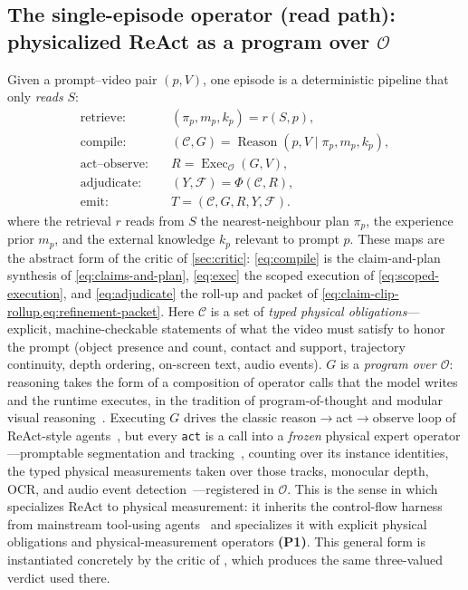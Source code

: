 \subsection{The single-episode operator (read path): physicalized ReAct as a program over \texorpdfstring{$\mathcal{O}$}{O}}
\label{sec:framework:episode}

Given a prompt--video pair $(p, V)$, one episode is a deterministic pipeline that
only \emph{reads} $S$:
\begin{align}
  \text{retrieve:}    &\quad (\pi_p, m_p, k_p) = r(S, p), \label{eq:retrieve}\\
  \text{compile:}     &\quad (\mathcal{C}, G) = \operatorname{Reason}(p, V \mid \pi_p, m_p, k_p), \label{eq:compile}\\
  \text{act--observe:}&\quad R = \operatorname{Exec}_{\mathcal{O}}(G, V), \label{eq:exec}\\
  \text{adjudicate:}  &\quad (Y, \mathcal{F}) = \Phi(\mathcal{C}, R), \label{eq:adjudicate}\\
  \text{emit:}        &\quad T = (\mathcal{C}, G, R, Y, \mathcal{F}). \label{eq:trace}
\end{align}
where the retrieval $r$ reads from $S$ the nearest-neighbour plan $\pi_p$, the experience prior
$m_p$, and the external knowledge $k_p$ relevant to prompt $p$. These maps are the abstract form of
the critic of \cref{sec:critic}: \eqref{eq:compile}
is the claim-and-plan synthesis of \cref{eq:claims-and-plan}, \eqref{eq:exec} the scoped
execution of \cref{eq:scoped-execution}, and \eqref{eq:adjudicate} the roll-up and
packet of \cref{eq:claim-clip-rollup,eq:refinement-packet}.
Here $\mathcal{C}$ is a set of \emph{typed physical obligations}---explicit,
machine-checkable statements of what the video must satisfy to honor the prompt
(object presence and count, contact and support, trajectory continuity, depth
ordering, on-screen text, audio events). $G$ is a \emph{program over $\mathcal{O}$}:
reasoning takes the form of a composition of operator calls
that the model writes and the runtime executes, in the tradition of
program-of-thought and modular visual
reasoning~\cite{visprog2023,vipergpt2023,rewoo2023,llmcompiler2024}. Executing $G$
drives the classic reason$\rightarrow$act$\rightarrow$observe loop of ReAct-style
agents~\cite{react2023}, but every \texttt{act} is a call into a \emph{frozen}
physical expert operator---promptable segmentation and tracking~\cite{sam3_2025},
counting over its instance identities, the typed physical measurements taken over those
tracks, monocular depth, OCR, and audio event
detection~\cite{flexsed2025}---registered in $\mathcal{O}$. This is the sense in which
\PhyReAct{} specializes ReAct to physical measurement: it inherits the control-flow harness from
mainstream tool-using agents~\cite{toolformer2023,hugginggpt2023} and specializes
it with explicit physical obligations and physical-measurement operators
\textbf{(P1)}. This general form is instantiated concretely by the critic of
, which produces the same three-valued verdict used there.

